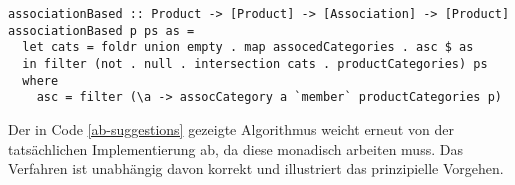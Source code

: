 \begin{lstlisting}[label=ab-suggestions,caption={Algorithmus zur Generierung association-basierter Produktempfehlungen}]
associationBased :: Product -> [Product] -> [Association] -> [Product]
associationBased p ps as =
  let cats = foldr union empty . map assocedCategories . asc $ as
  in filter (not . null . intersection cats . productCategories) ps
  where
    asc = filter (\a -> assocCategory a `member` productCategories p)
\end{lstlisting}
Der in Code \ref{ab-suggestions} gezeigte Algorithmus weicht erneut von der tatsächlichen Implementierung ab, da diese monadisch arbeiten muss. Das Verfahren ist unabhängig davon korrekt und illustriert das prinzipielle Vorgehen.